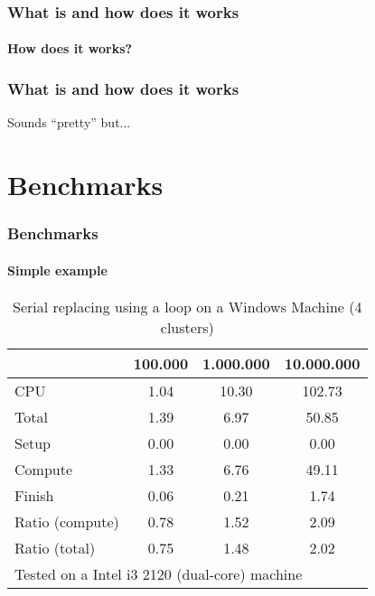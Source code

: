 \documentclass[11pt, handout]{beamer}
\def\windows1{Intel i3 2120 (dual-core)}
\begin{document}
\begin{frame}
\frametitle{What is and how does it works}
\framesubtitle{How does it works?}
\begin{figure}
\centering
\scalebox{.65}{}
\end{figure}
\end{frame}

\begin{frame}
\frametitle{What is and how does it works}
{\Large Sounds ``pretty'' but...}
\end{frame}

\section{Benchmarks}
\frame{\tableofcontents[currentsection]}

\begin{frame}
\frametitle{Benchmarks}
\framesubtitle{Simple example}

\begin{table}[!h]
\centering
\caption{Serial replacing using a loop on a Windows Machine (4 clusters)}
\begin{tabular}{l*{3}{c}}\hline
& 100.000 &       1.000.000 &      10.000.000 \\ \hline
CPU &     1.04 &     10.30 &    102.73 \\
Total &     1.39 &      6.97 &     50.85 \\
\hspace{2mm} Setup &     0.00 &      0.00 &      0.00 \\
\hspace{2mm} Compute &     1.33 &      6.76 &     49.11 \\
\hspace{2mm} Finish &     0.06 &      0.21 &      1.74 \\
\hline Ratio (compute) &     0.78 &      1.52 &      2.09 \\
Ratio (total) &     0.75 &      1.48 &      2.02 \\
\hline
\multicolumn{4}{l}{\footnotesize Tested on a \windows1 machine}
\end{tabular}
\end{table}

\end{frame}
\end{document}
